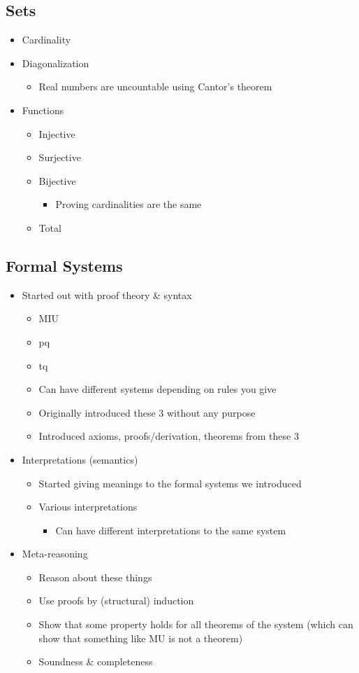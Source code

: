 \documentclass[11pt]{article}
\begin{document}
\subsection{Sets}
\label{sec:org09bd342}
\begin{itemize}
\item Cardinality
\item Diagonalization
\begin{itemize}
\item Real numbers are uncountable using Cantor's theorem
\end{itemize}
\item Functions
\begin{itemize}
\item Injective
\item Surjective
\item Bijective
\begin{itemize}
\item Proving cardinalities are the same
\end{itemize}
\item Total
\end{itemize}
\end{itemize}
\subsection{Formal Systems}
\label{sec:org5f44919}
\begin{itemize}
\item Started out with proof theory \& syntax
\begin{itemize}
\item MIU
\item pq
\item tq
\item Can have different systems depending on rules you give
\item Originally introduced these 3 without any purpose
\item Introduced axioms, proofs/derivation, theorems from these 3
\end{itemize}
\item Interpretations (semantics)
\begin{itemize}
\item Started giving meanings to the formal systems we introduced
\item Various interpretations
\begin{itemize}
\item Can have different interpretations to the same system
\end{itemize}
\end{itemize}
\item Meta-reasoning
\begin{itemize}
\item Reason about these things
\item Use proofs by (structural) induction
\item Show that some property holds for all theorems of the system (which can show that something like MU is not a theorem)
\item Soundness \& completeness
\end{itemize}
\end{itemize}
\end{document}
